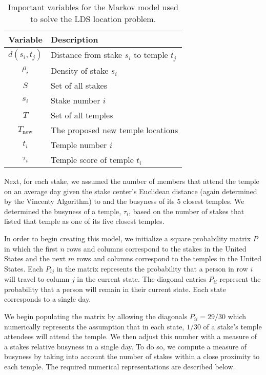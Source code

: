 \documentclass[twoside,twocolumn]{article}
\begin{document}
\begin{table}
\begin{tabular}{c | l}
Variable & Description\\
\hline
$d(s_i,t_j)$ & Distance from stake $s_i$ to temple $t_j$\\
$\rho_i$ & Density of stake $s_i$\\
$S$ & Set of all stakes\\
$s_i$ & Stake number $i$\\
$T$ & Set of all temples\\
$T_{\text{new}}$ & The proposed new temple locations\\
$t_i$ & Temple number $i$ \\
$\tau_i$ & Temple score of temple $t_i$\\
\end{tabular}
\caption{Important variables for the Markov model used to solve the LDS location problem.}
\end{table}

Next, for each stake, we assumed the number of members that attend the temple on an average day given the stake center's Euclidean distance (again determined by the Vincenty Algorithm) to and the busyness of its 5 closest temples.
We determined the busyness of a temple, $\tau_i$, based on the number of stakes that listed that temple as one of its five closest temples.

In order to begin creating this model, we initialize a square probability matrix $P$ in which the first $n$ rows and columns correspond to the stakes in the United States and the next $m$ rows and columns correspond to the temples in the United States.
Each $P_{ij}$ in the matrix represents the probability that a person in row $i$ will travel to column $j$ in the current state.
The diagonal entries $P_{ii}$ represent the probability that a person will remain in their current state.
Each state corresponds to a single day.


We begin populating the matrix by allowing the diagonals $P_{ii} = 29/30$ which numerically represents the assumption that in each state, $1/30$ of a stake's temple attendees will attend the temple.
We then adjust this number with a measure of a stakes relative busyness in a single day.
To do so, we compute a measure of busyness by taking into account the number of stakes within a close proximity to each temple.
The required numerical representations are described below.
\end{document}
